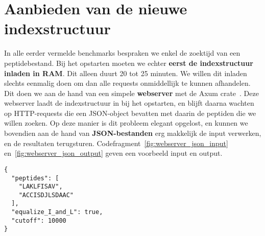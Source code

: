 \section{Aanbieden van de nieuwe indexstructuur}\label{sec:aanbieden-van-de-nieuwe-indexstructuur}
In alle eerder vermelde benchmarks bespraken we enkel de zoektijd van een peptidebestand.
Bij het opstarten moeten we echter \textbf{eerst de indexstructuur inladen in RAM}.
Dit alleen duurt 20 tot 25 minuten.
We willen dit inladen slechts eenmalig doen om dan alle requests onmiddellijk te kunnen afhandelen.
Dit doen we aan de hand van een simpele \textbf{webserver} met de Axum crate~\cite{axum}.
Deze webserver laadt de indexstructuur in bij het opstarten, en blijft daarna wachten op HTTP-requests die een JSON-object bevatten met daarin de peptiden die we willen zoeken.
Op deze manier is dit probleem elegant opgelost, en kunnen we bovendien aan de hand van \textbf{JSON-bestanden} erg makkelijk de input verwerken, en de resultaten terugsturen.
Codefragment~\ref{fig:webserver_json_input} en~\ref{fig:webserver_json_output} geven een voorbeeld input en output.

\begin{listing}[H]
    \begin{verbatim}
{
  "peptides": [
    "LAKLFISAV",
    "ACCISDJLSDAAC"
  ],
  "equalize_I_and_L": true,
  "cutoff": 10000
}
    \end{verbatim}
    \caption{Voorbeeld JSON-input voor de webserver waarbij de peptiden \texttt{LAKLFISAV} en \texttt{ACCISDJLSDAAC} gezocht worden.
    Tijdens het zoeken worden I en L gelijkgesteld, en wordt de drempelwaarde B=10 gebruikt.
    Indien er meer matches zijn dan de drempelwaarde B, worden er slechts B matches terug gegeven en de resulterende LCA op 1 gezet.
    Dit laatste argument zou ook weggelaten kunnen worden aangezien de standaardwaarde gebruikt wordt.}
    \label{fig:webserver_json_input}
\end{listing}


